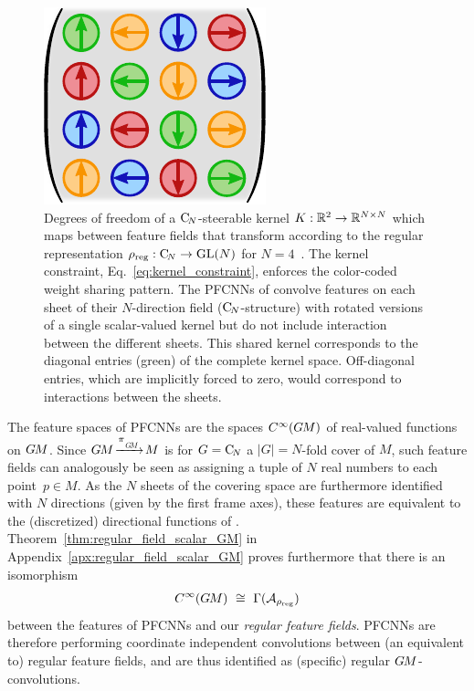\begin{figure}
    \hspace*{-2ex}
    \includegraphics[width=.24\columnwidth]{figures/regular_C4_kernel.pdf}
    \captionsetup{width=1.1\columnwidth}
    \hspace{2ex}
    \caption{\small
        Degrees of freedom of a $\operatorname{C}_{\!N}$-steerable kernel ${K: \mathbb{R}^2 \to \mathbb{R}^{N\times N}}$ which maps between feature fields that transform according to the regular representation ${\rho_{\textup{reg}}: \operatorname{C}_{\!N} \to \operatorname{GL}(N)}$ for $N=4$~\cite{Weiler2019_E2CNN}.
        The kernel constraint, Eq.~\eqref{eq:kernel_constraint}, enforces the color-coded weight sharing pattern.
        The \mbox{PFCNNs} of \citet{Yang2020parallelFrameCNN} convolve features on each sheet of their $N$-direction field ($\operatorname{C}_{\!N}$-structure) with rotated versions of a single scalar-valued kernel but do not include interaction between the different sheets.
        This shared kernel corresponds to the diagonal entries (green) of the complete kernel space.
        Off-diagonal entries, which are implicitly forced to zero, would correspond to interactions between the sheets.
        }
    \label{fig:regular_C4_kernel}
\end{figure}

The feature spaces of PFCNNs are the spaces $C^\infty(G\mkern-1.4muM)$ of real-valued functions on $G\mkern-1.4muM$.
Since $\GM\!\xrightarrow{\piGM}\!M$ is for $G=\operatorname{C}_{\!N}$ a $|G| = N$-fold cover of $M$, such feature fields can analogously be seen as assigning a tuple of $N$ real numbers to each point~$p\in M$.
As the $N$ sheets of the covering space are furthermore identified with $N$ directions (given by the first frame axes), these features are equivalent to the (discretized) directional functions of \citet{poulenard2018multi}.
Theorem~\ref{thm:regular_field_scalar_GM} in Appendix~\ref{apx:regular_field_scalar_GM} proves furthermore that there is an isomorphism
\begin{align}
    C^\infty(G\mkern-1.4muM)\ \cong\ \Gamma(\mathcal{A}_{\rho_\textup{reg}})
\end{align}
between the features of PFCNNs and our \emph{regular feature fields}.
PFCNNs are therefore performing coordinate independent convolutions between (an equivalent to) regular feature fields, and are thus identified as (specific) regular $G\mkern-1.4muM$-convolutions.

